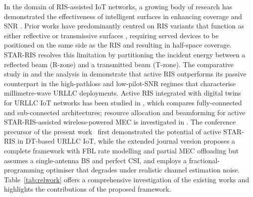 \documentclass[journal]{IEEEtran}
\begin{document}
In the domain of RIS-assisted IoT networks, a growing body of
research has demonstrated the effectiveness of intelligent surfaces
in enhancing coverage and SNR
\cite{wu2019irs,wu2021tutorial,direnzo2020smart,basar2019wireless}.
Prior works have predominantly centred on RIS variants that function
as either reflective or transmissive surfaces
\cite{wu2019irs,pan2021reconfigurable}, requiring served devices to be
positioned on the same side as the RIS and resulting in half-space
coverage. STAR-RIS \cite{liu2021star,xu2021star,mu2022star} resolves
this limitation by partitioning the incident energy between a reflected
beam (R-zone) and a transmitted beam (T-zone). The comparative study
in \cite{zhang2023activevspassive} and the analysis in
\cite{zhi2022activeris} demonstrate that active RIS outperforms its
passive counterpart in the high-pathloss and low-pilot-SNR regimes
that characterise millimetre-wave URLLC deployments. Active RIS
integrated with digital twins for URLLC IoT networks has been studied
in \cite{kurma2024activeris}, which compares fully-connected and
sub-connected architectures; resource allocation and beamforming for
active STAR-RIS-assisted wireless-powered MEC is investigated in
\cite{lestari2025fbl}. The conference precursor of the present
work~\cite{lestari2024icc} first demonstrated the potential of active
STAR-RIS in DT-based URLLC IoT, while the extended journal version
\cite{paul2024active} proposes a complete framework with FBL rate
modelling and partial MEC offloading but assumes a single-antenna BS
and perfect CSI, and employs a fractional-programming optimiser that
degrades under realistic channel estimation noise.
Table~\ref{tab:relwork} offers a comprehensive investigation of the
existing works and highlights the contributions of the proposed
framework.
\end{document}
